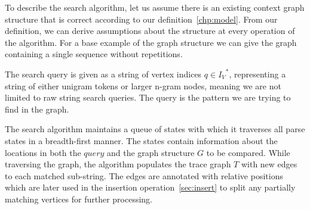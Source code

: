 \noindent
To describe the search algorithm, let us assume there is an existing context graph structure that is correct according to our definition~\ref{chp:model}. From our definition, we can derive assumptions about the structure at every operation of the algorithm. For a base example of the graph structure we can give the graph containing a single sequence without repetitions.

\noindent 
The search query is given as a string of vertex indices $q \in {I_V}^*$, representing a string of either unigram tokens or larger n-gram nodes, meaning we are not limited to raw string search queries. The query is the pattern we are trying to find in the graph.

\noindent
The search algorithm maintains a queue of states with which it traverses all parse states in a breadth-first manner. The states contain information about the locations in both the $query$ and the graph structure $G$ to be compared. While traversing the graph, the algorithm populates the trace graph $T$ with new edges to each matched sub-string. The edges are annotated with relative positions which are later used in the insertion operation~\ref{sec:insert} to split any partially matching vertices for further processing.

